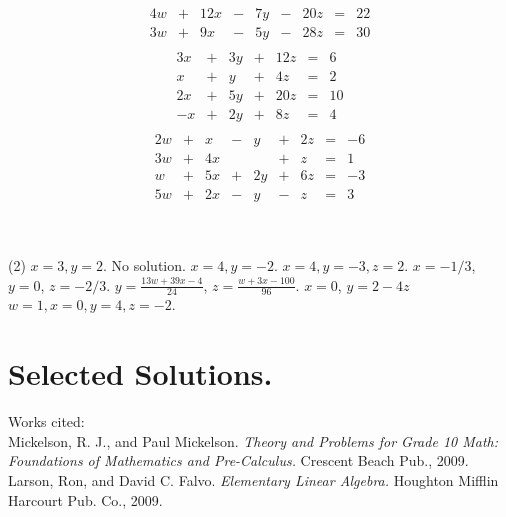 \documentclass[12pt,fleqn]{book}
\newcommand{\sol}[1]{\begin{Answer}#1\end{Answer}}
\begin{document}
{\begin{tasks}
\begin{align*}
		\begin{array}{rrrrrrrrr}
			4w&+&12x &-&7y&-&20z&=&22 \\
			3w&+&9x  &-&5y&-&28z&=&30
		\end{array}
		\end{align*}
		\clearpage
		\task \vspace{-2.3em}
		\begin{align*}
			\begin{array}{rrrrrrr}
			 3x&+&3y&+&12z&=&6 \\
				x&+& y&+& 4z&=&2 \\
			 2x&+&5y&+&20z&=&10 \\
			 -x&+&2y&+& 8z&=&4
			\end{array}
		\end{align*}
		\task \vspace{-2.3em}
		\begin{align*}
			\begin{array}{rrrrrrrrr}
				2w&+& x &-& y&+&2z&=&-6 \\
				3w&+&4x & &  &+& z&=&1  \\
				 w&+&5x &+&2y&+&6z&=&-3 \\
				5w&+&2x &-& y&-& z&=&3
			\end{array}
		\end{align*}
\end{tasks}
}
\clearpage
\
\newpage
\sol{
\begin{tasks}(2)
	\task $x=3,y=2$.
	\task No solution.
	\task $x=4,y=-2$.
	\task $x=4,y=-3,z=2$.
	\task $x=-1/3$, $y=0$, $z=-2/3$.
	\task $y=\frac{13w+39x-4}{24}$, $z=\frac{w+3x-100}{96}$.
	\task $x=0$, $y=2-4z$
	\task $w=1,x=0,y=4,z=-2$.
\end{tasks}
 }
\chapter{Selected Solutions.}
\shipoutAnswer
\clearpage
Works cited:
\\[1em]
Mickelson, R. J., and Paul Mickelson. \emph{Theory and Problems for Grade 10 Math: Foundations of Mathematics and Pre-Calculus.} Crescent Beach Pub., 2009.
\\[1em]
Larson, Ron, and David C. Falvo. \emph{Elementary Linear Algebra.} Houghton Mifflin Harcourt Pub. Co., 2009.
\end{document}
